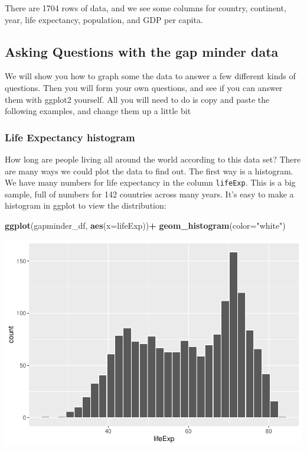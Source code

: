 \documentclass[
]{book}
\newenvironment{Shaded}{\begin{snugshade}}{\end{snugshade}}
\newcommand{\AttributeTok}[1]{\textcolor[rgb]{0.13,0.29,0.53}{#1}}
\newcommand{\FunctionTok}[1]{\textcolor[rgb]{0.13,0.29,0.53}{\textbf{#1}}}
\newcommand{\NormalTok}[1]{#1}
\newcommand{\SpecialCharTok}[1]{\textcolor[rgb]{0.81,0.36,0.00}{\textbf{#1}}}
\newcommand{\StringTok}[1]{\textcolor[rgb]{0.31,0.60,0.02}{#1}}
\begin{document}
There are 1704 rows of data, and we see some columns for country, continent, year, life expectancy, population, and GDP per capita.

\hypertarget{asking-questions-with-the-gap-minder-data}{%
\subsection{Asking Questions with the gap minder data}\label{asking-questions-with-the-gap-minder-data}}

We will show you how to graph some the data to answer a few different kinds of questions. Then you will form your own questions, and see if you can answer them with ggplot2 yourself. All you will need to do is copy and paste the following examples, and change them up a little bit

\hypertarget{life-expectancy-histogram}{%
\subsubsection{Life Expectancy histogram}\label{life-expectancy-histogram}}

How long are people living all around the world according to this data set? There are many ways we could plot the data to find out. The first way is a histogram. We have many numbers for life expectancy in the column \texttt{lifeExp}. This is a big sample, full of numbers for 142 countries across many years. It's easy to make a histogram in ggplot to view the distribution:

\begin{Shaded}
\begin{Highlighting}[]
\FunctionTok{ggplot}\NormalTok{(gapminder\_df, }\FunctionTok{aes}\NormalTok{(}\AttributeTok{x=}\NormalTok{lifeExp))}\SpecialCharTok{+}
  \FunctionTok{geom\_histogram}\NormalTok{(}\AttributeTok{color=}\StringTok{"white"}\NormalTok{)}
\end{Highlighting}
\end{Shaded}

\includegraphics{Statistics_Lab_files/figure-latex/1gapminder-1.pdf}
\end{document}
